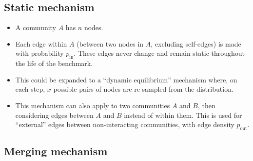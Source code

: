 \documentclass{article}
\def\pin{p_\mathrm{in}}
\def\pout{p_\mathrm{out}}
\begin{document}
\subsection{Static mechanism}
\begin{itemize}
\item A community $A$ has $n$ nodes.
\item Each edge within $A$ (between two nodes in $A$, excluding
  self-edges) is made with probability $\pin$.  These edges never
  change and remain static throughout the life of the benchmark.
\item This could be expanded to a ``dynamic equilibrium'' mechanism
  where, on each step, $x$ possible pairs of nodes are re-sampled from
  the distribution.
\item This mechanism can also apply to two communities $A$ and $B$,
  then considering edges between $A$ and $B$ instead of within them.
  This is used for ``external'' edges between non-interacting
  communities, with edge density $\pout$.
\end{itemize}



\subsection{Merging mechanism}
\end{document}

